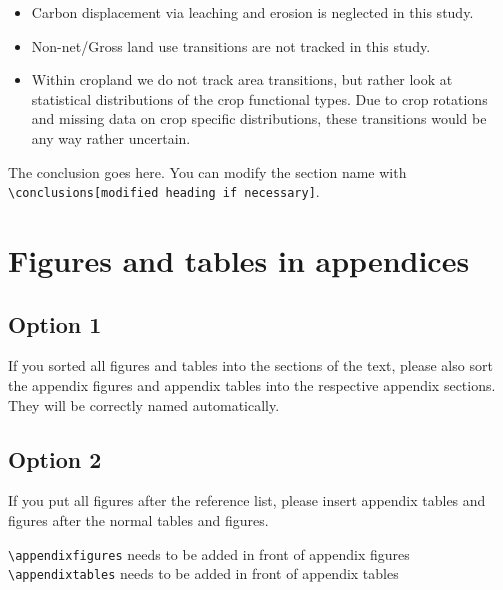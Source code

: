\documentclass[gc, manuscript]{copernicus}
\begin{document}
\begin{itemize}
\item
  Carbon displacement via leaching and erosion is neglected in this
  study.
\item
  Non-net/Gross land use transitions are not tracked in this study.
\item
  Within cropland we do not track area transitions, but rather look at
  statistical distributions of the crop functional types. Due to crop
  rotations and missing data on crop specific distributions, these
  transitions would be any way rather uncertain. \newpage
\end{itemize}

\conclusions

The conclusion goes here. You can modify the section name with
\texttt{\textbackslash{}conclusions{[}modified\ heading\ if\ necessary{]}}.
\newpage








\appendix
\section{Figures and tables in appendices}
\subsection{Option 1}

If you sorted all figures and tables into the sections of the text,
please also sort the appendix figures and appendix tables into the
respective appendix sections. They will be correctly named
automatically.

\subsection{Option 2}

If you put all figures after the reference list, please insert appendix
tables and figures after the normal tables and figures.

\texttt{\textbackslash{}appendixfigures} needs to be added in front of
appendix figures \texttt{\textbackslash{}appendixtables} needs to be
added in front of appendix tables
\end{document}
